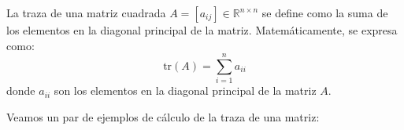 \begin{definición}
    La traza de una matriz cuadrada \( A = [a_{ij}] \in \mathbb{R}^{n \times n} \) se define como la suma de los elementos en la diagonal principal de la matriz. Matemáticamente, se expresa como:
    \[
        \text{tr}(A) = \sum_{i=1}^{n} a_{ii}
    \]
    donde \( a_{ii} \) son los elementos en la diagonal principal de la matriz \( A \).    
\end{definición}

Veamos un par de ejemplos de cálculo de la traza de una matriz:

